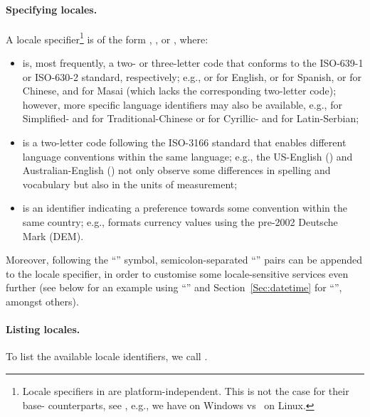 \documentclass[nojss]{jss}\usepackage[]{graphicx}\usepackage[]{xcolor}
\begin{document}
\paragraph{Specifying locales.}
A locale specifier\footnote{%
Locale specifiers in  are platform-independent.
This is not the case for their base- counterparts, see
, e.g., we have  on Windows
vs~ on Linux.}
is of the form
, , or ,
where:
\begin{itemize}
\item
{} is, most frequently, a two- or three-letter code that conforms to
the ISO-639-1 or ISO-630-2 standard, respectively;
e.g.,  or  for English,  or 
for Spanish,  or  for Chinese, and  for Masai
(which lacks the corresponding two-letter code);
however, more specific language identifiers may also be
available, e.g.,  for Simplified-
and  for Traditional-Chinese
or  for Cyrillic- and  for Latin-Serbian;


\item
{} is a two-letter code following the ISO-3166 standard
that enables different language conventions within the same language;
e.g., the US-English () and Australian-English ()
not only observe some differences in spelling and vocabulary but also
in the units of measurement;

\item
{} is an identifier indicating a preference towards
some convention within the same country; e.g., 
formats currency values using the pre-2002 Deutsche Mark (DEM).
\end{itemize}
Moreover,  following the
``'' symbol, semicolon-separated ``'' pairs
can be appended to the locale specifier, in order to
customise some locale-sensitive services even further
(see below for an example using ``''
and Section~\ref{Sec:datetime} for ``'', amongst others).


{\color{red}

}





\paragraph{Listing locales.}
To list the available locale identifiers, we call .
\end{document}
